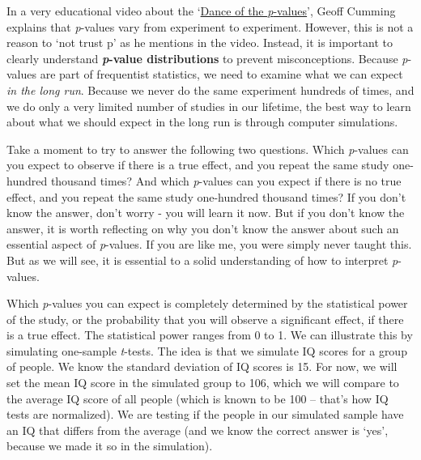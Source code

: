\documentclass[
]{krantz}
\begin{document}
In a very educational video about the `\href{https://www.youtube.com/watch?v=5OL1RqHrZQ8}{Dance of the \emph{p}-values}', Geoff Cumming explains that \emph{p}-values vary from experiment to experiment. However, this is not a reason to `not trust p' as he mentions in the video. Instead, it is important to clearly understand \textbf{\emph{p}-value distributions} to prevent misconceptions. Because \emph{p}-values are part of frequentist statistics, we need to examine what we can expect \emph{in the long run}. Because we never do the same experiment hundreds of times, and we do only a very limited number of studies in our lifetime, the best way to learn about what we should expect in the long run is through computer simulations.

Take a moment to try to answer the following two questions. Which \emph{p}-values can you expect to observe if there is a true effect, and you repeat the same study one-hundred thousand times? And which \emph{p}-values can you expect if there is no true effect, and you repeat the same study one-hundred thousand times? If you don't know the answer, don't worry - you will learn it now. But if you don't know the answer, it is worth reflecting on why you don't know the answer about such an essential aspect of \emph{p}-values. If you are like me, you were simply never taught this. But as we will see, it is essential to a solid understanding of how to interpret \emph{p}-values.

Which \emph{p}-values you can expect is completely determined by the statistical power of the study, or the probability that you will observe a significant effect, if there is a true effect. The statistical power ranges from 0 to 1. We can illustrate this by simulating one-sample \emph{t}-tests. The idea is that we simulate IQ scores for a group of people. We know the standard deviation of IQ scores is 15. For now, we will set the mean IQ score in the simulated group to 106, which we will compare to the average IQ score of all people (which is known to be 100 -- that's how IQ tests are normalized). We are testing if the people in our simulated sample have an IQ that differs from the average (and we know the correct answer is `yes', because we made it so in the simulation).
\end{document}
